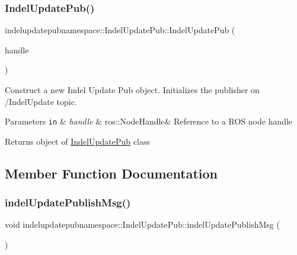 \subsubsection{\texorpdfstring{Indel\+Update\+Pub()}{IndelUpdatePub()}}
{\footnotesize\ttfamily indelupdatepubnamespace\+::\+Indel\+Update\+Pub\+::\+Indel\+Update\+Pub (\begin{DoxyParamCaption}\item[{ros\+::\+Node\+Handle \&}]{handle }\end{DoxyParamCaption})}



Construct a new Indel Update Pub object. Initializes the publisher on /\+Indel\+Update topic. 


\begin{DoxyParams}[1]{Parameters}
\mbox{\tt in}  & {\em handle} & ros\+::\+Node\+Handle\& Reference to a R\+OS node handle \\
\hline
\end{DoxyParams}
\begin{DoxyReturn}{Returns}
object of \hyperlink{classindelupdatepubnamespace_1_1IndelUpdatePub}{Indel\+Update\+Pub} class 
\end{DoxyReturn}


\subsection{Member Function Documentation}
\mbox{\label{classindelupdatepubnamespace_1_1IndelUpdatePub_a8ea3e14488f0844df85432ba22b8925d}} 
\subsubsection{\texorpdfstring{indel\+Update\+Publish\+Msg()}{indelUpdatePublishMsg()}}
{\footnotesize\ttfamily void indelupdatepubnamespace\+::\+Indel\+Update\+Pub\+::indel\+Update\+Publish\+Msg (\begin{DoxyParamCaption}\item[{void}]{ }\end{DoxyParamCaption})}



